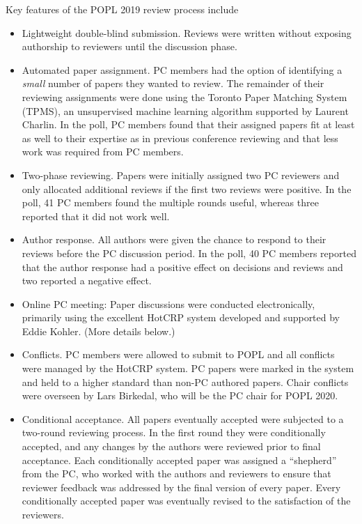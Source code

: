 Key features of the POPL 2019 review process include
\begin{itemize}
\item Lightweight double-blind submission. Reviews were written without
  exposing authorship to reviewers until the discussion phase.
\item Automated paper assignment. PC members had the option of identifying a
  \emph{small} number of papers they wanted to review. The
  remainder of their reviewing assignments were done using the Toronto Paper
  Matching System (TPMS), an unsupervised machine learning algorithm supported
  by Laurent Charlin. In the poll, PC members found that their assigned
  papers fit at least as well to their expertise as in previous conference
  reviewing and that less work was required from PC members.
\item Two-phase reviewing. Papers were initially assigned two PC reviewers
  and only allocated additional reviews if the first two reviews were
  positive. In the poll, 41 PC members found the multiple rounds
  useful, whereas three reported that it did not work well.
\item Author response. All authors were given the chance to respond to their
  reviews before the PC discussion period. In the poll, 40 PC members
  reported that the author response had a positive effect on decisions and
  reviews and two reported a negative effect.
\item Online PC meeting: Paper discussions were conducted electronically,
  primarily using the excellent HotCRP system developed and supported by Eddie
  Kohler. (More details below.)
\item Conflicts. PC members were allowed to submit to POPL and all conflicts
  were managed by the HotCRP system. PC papers were marked in the system and
  held to a higher standard than non-PC authored papers. Chair conflicts were
  overseen by Lars Birkedal, who will be the PC chair for POPL 2020.
\item Conditional acceptance. All papers eventually accepted were subjected 
  to a two-round reviewing process.  In the first round they were
  conditionally accepted, and any changes by the authors were reviewed prior to
  final acceptance. Each conditionally accepted paper was assigned a ``shepherd''
  from the PC, who worked with the authors and reviewers to ensure that
  reviewer feedback was addressed by the final version of every paper. Every
  conditionally accepted paper was eventually revised to the satisfaction of
  the reviewers.
\end{itemize}

